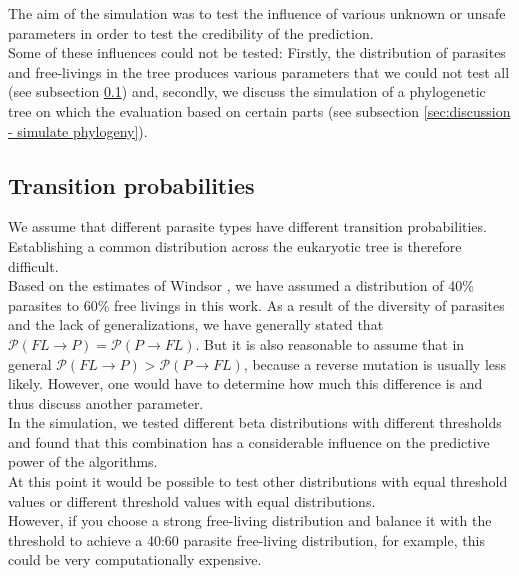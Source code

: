     The aim of the simulation was to test the influence of various unknown or unsafe parameters in 
      order to test the credibility of the prediction. \\
    Some of these influences could not be tested: Firstly, the distribution of parasites and 
      free-livings in the tree produces various parameters that we could not test all (see subsection 
      \ref{sec:discussion - transition probabilities}) and, secondly, we discuss the simulation of a 
      phylogenetic tree on which the evaluation based on certain parts (see subsection 
      \ref{sec:discussion - simulate phylogeny}).

    \subsection{Transition probabilities} \label{sec:discussion - transition probabilities}
      We assume that different parasite types have different transition probabilities. Establishing a 
        common distribution across the eukaryotic tree is therefore difficult. \\
      Based on the estimates of Windsor \cite{Windsor1998}, we have assumed a distribution of 40\% 
        parasites to 60\% free livings in this work. As a result of the diversity of parasites and the 
        lack of generalizations, we have generally stated that 
        $\mathcal{P}(FL \rightarrow P) = \mathcal{P}(P \rightarrow FL)$. But it is also reasonable to 
        assume that in general $\mathcal{P}(FL \rightarrow P) > \mathcal{P}(P \rightarrow FL)$, because 
        a reverse mutation is usually less likely. However, one would have to determine how much this 
        difference is and thus discuss another parameter. \\
      
      In the simulation, we tested different beta distributions with different thresholds and found that 
        this combination has a considerable influence on the predictive power of the algorithms. \\
      At this point it would be possible to test other distributions with equal threshold values or 
        different threshold values with equal distributions. \\
      However, if you choose a strong free-living distribution and balance it with the threshold to 
        achieve a 40:60 parasite free-living distribution, for example, this could be very 
        computationally expensive. \\
      
